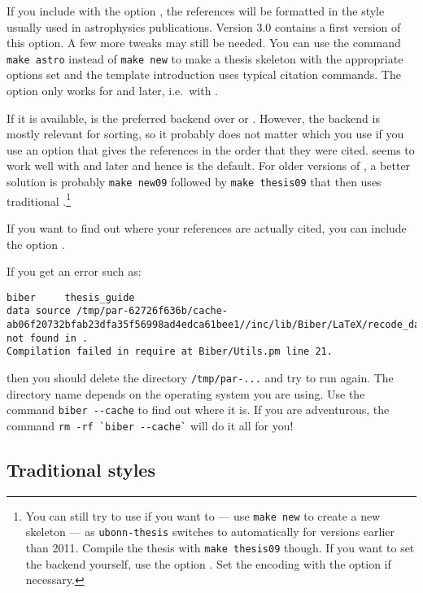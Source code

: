 If you include  with the option ,
the references will be formatted in the style usually used in astrophysics publications.
Version 3.0 contains a first version of this option.
A few more tweaks may still be needed. You can use the command
\verb|make astro| instead of \verb|make new| to make a thesis skeleton with the appropriate
options set and the template introduction uses typical citation commands.
The option  only works for  and later, i.e.\ with .

If it is available,  is the preferred backend over
 or .
However, the backend is mostly relevant for
sorting, so it probably does not matter which you use if you use an
option that gives the references in the order that they were
cited.  seems to work well with  and later and hence is the default.
For older versions of \TeXLive, a better solution is probably \texttt{make new09}
followed by \texttt{make thesis09} that then uses traditional \BibTeX.\footnote{%
You can still try to use  if you want to --- use \texttt{make new} to create a new skeleton ---
as \texttt{ubonn-thesis} switches to  automatically for \TeXLive
versions earlier than 2011.
Compile the thesis with \texttt{make thesis09} though.
If you want to set the backend yourself, use the option .
Set the encoding with the option  if necessary.}

If you want to find out where your references are actually cited, you
can include the option .

If you get an error such as:
{\scriptsize
\begin{verbatim}
biber     thesis_guide
data source /tmp/par-62726f636b/cache-ab06f20732bfab23dfa35f56998ad4edca61bee1//inc/lib/Biber/LaTeX/recode_data.xml not found in .
Compilation failed in require at Biber/Utils.pm line 21.
\end{verbatim}
}
\noindent
then you should delete the directory \texttt{/tmp/par-...} and try to
run again. The directory name depends on the operating system you are using.
Use the command \verb|biber --cache| to find out where it is.
If you are adventurous, the command \verb|rm -rf `biber --cache`| will do it all for you!


\subsection{Traditional \BibTeX{} styles}
\label{sec:ref:bst}

